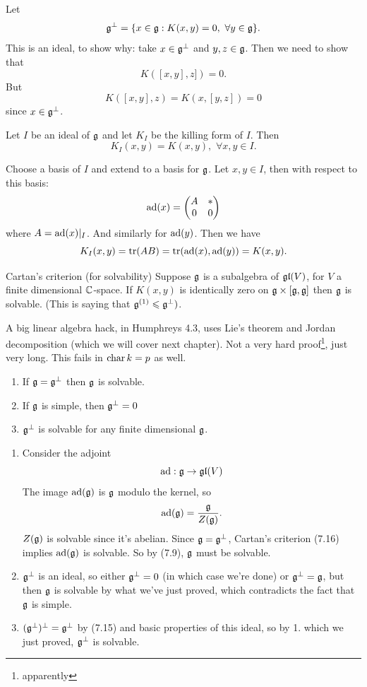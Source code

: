 \documentclass{article}
\begin{document}
\endproof
Let \[ \mathfrak{g}^{\perp} = \{ x \in \mathfrak{g} : K(x,y)=0, \, \, \forall y \in \mathfrak{g} \}. \] This is an ideal, to show why: take $x \in \mathfrak{g}^{\perp}$ and $y,z \in \mathfrak{g}$. Then we need to show that \[ K([x,y],z])=0.\] But \[K([x,y],z) = K(x,[y,z]) = 0\] since $x \in \mathfrak{g}^{\perp}$.
\begin{fancylem}{}
    Let $I$ be an ideal of $\mathfrak{g}$ and let $K_{I}$ be the killing form of $I$. Then \[ K_{I}(x,y)=K(x,y), \, \, \forall x,y \in I. \]
\end{fancylem}
\proof Choose a basis of $I$ and extend to a basis for $\mathfrak{g}$. Let $x,y \in I$, then with respect to this basis: \[ \operatorname{ad}(x) = \begin{pmatrix}
    A & * \\
    0 & 0
\end{pmatrix} \] where $A= \operatorname{ad}(x)|_{I}$. And similarly for $\operatorname{ad}(y)$. Then we have \[ K_{I}(x,y) = \tr(AB) = \tr(\operatorname{ad}(x),\operatorname{ad}(y))=K(x,y).\]
\begin{fancythm}{Cartan's criterion (for solvability)}
Suppose $\mathfrak{g}$ is a subalgebra of $\mathfrak{gl}(V)$, for $V$ a finite dimensional $\mathbb{C}$-space. If $K(x,y)$ is identically zero on $\mathfrak{g} \times [\mathfrak{g},\mathfrak{g}]$ then $\mathfrak{g}$ is solvable. (This is saying that $\mathfrak{g}^{(1)}\leqslant \mathfrak{g}^{\perp})$.
\end{fancythm}
\proof A big linear algebra hack, in Humphreys 4.3, uses Lie's theorem and Jordan decomposition (which we will cover next chapter). Not a very hard proof\footnote{apparently}, just very long. This fails in $\operatorname{char} k = p$ as well. \endproof
\begin{corr}{}
    \hspace{0.1cm} \begin{enumerate}
        \item If $\mathfrak{g} = \mathfrak{g}^{\perp}$ then $\mathfrak{g}$ is solvable.
        \item If $\mathfrak{g}$ is simple, then $\mathfrak{g}^{\perp}=0$
        \item $\mathfrak{g}^{\perp}$ is solvable for any finite dimensional $\mathfrak{g}$.
    \end{enumerate}
\end{corr}
\proof \hspace{0.1cm}
\begin{enumerate}
    \item Consider the adjoint \[ \operatorname{ad} : \mathfrak{g} \to \mathfrak{gl}(V) \] The image $\operatorname{ad} (\mathfrak{g})$ is $\mathfrak{g}$ modulo the kernel, so \[ \operatorname{ad}(\mathfrak{g}) = \frac{\mathfrak{g}}{Z(\mathfrak{g})}.\] $Z(\mathfrak{g})$ is solvable since it's abelian. Since $\mathfrak{g} = \mathfrak{g}^{\perp}$, Cartan's criterion (7.16) implies $\operatorname{ad}(\mathfrak{g})$ is solvable. So by (7.9), $\mathfrak{g}$ must be solvable.
    \item $\mathfrak{g}^{\perp}$ is an ideal, so either $\mathfrak{g}^{\perp}=0$ (in which case we're done) or $\mathfrak{g}^{\perp}=\mathfrak{g}$, but then $\mathfrak{g}$ is solvable by what we've just proved, which contradicts the fact that $\mathfrak{g}$ is simple.
    \item $(\mathfrak{g}^{\perp})^{\perp} = \mathfrak{g}^{\perp}$ by (7.15) and basic properties of this ideal, so by 1. which we just proved, $\mathfrak{g}^{\perp}$ is solvable. 
\end{enumerate}
\end{document}

